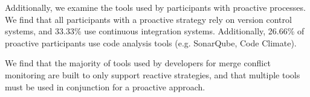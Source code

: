 Additionally, we examine the tools used by participants with proactive processes.
We find that all participants with a proactive strategy rely on version control systems, and 33.33\% use continuous integration systems.
Additionally, 26.66\% of proactive participants use code analysis tools (e.g. SonarQube, Code Climate).

We find that the majority of tools used by developers for merge conflict monitoring are built to only support reactive strategies, and that multiple tools must be used in conjunction for a proactive approach.


\newcolumntype{b}{X}

